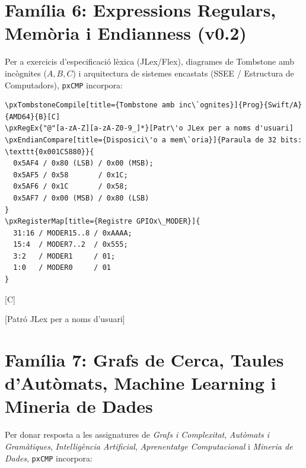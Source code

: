 \documentclass[11pt,a4paper]{article}
\begin{document}

\section{Fam\'ilia 6: Expressions Regulars, Mem\`oria i Endianness (v0.2)}

Per a exercicis d'especificaci\'o l\`exica (JLex/Flex), diagrames de Tombstone amb inc\`ognites ($A, B, C$) i arquitectura de sistemes encastats (SSEE / Estructura de Computadors), \texttt{pxCMP} incorpora:

\begin{verbatim}
\pxTombstoneCompile[title={Tombstone amb inc\`ognites}]{Prog}{Swift/A}{AMD64}{B}[C]
\pxRegEx{"@"[a-zA-Z][a-zA-Z0-9_]*}[Patr\'o JLex per a noms d'usuari]
\pxEndianCompare[title={Disposici\'o a mem\`oria}]{Paraula de 32 bits: \texttt{0x001C5880}}{
  0x5AF4 / 0x80 (LSB) / 0x00 (MSB);
  0x5AF5 / 0x58       / 0x1C;
  0x5AF6 / 0x1C       / 0x58;
  0x5AF7 / 0x00 (MSB) / 0x80 (LSB)
}
\pxRegisterMap[title={Registre GPIOx\_MODER}]{
  31:16 / MODER15..8 / 0xAAAA;
  15:4  / MODER7..2  / 0x555;
  3:2   / MODER1     / 01;
  1:0   / MODER0     / 01
}
\end{verbatim}

[C]

[Patr\'o JLex per a noms d'usuari]



\newpage
\section{Fam\'ilia 7: Grafs de Cerca, Taules d'Aut\`omats, Machine Learning i Mineria de Dades}

Per donar resposta a les assignatures de \emph{Grafs i Complexitat}, \emph{Aut\`omats i Gram\`atiques}, \emph{Intel\textperiodcentered lig\`encia Artificial}, \emph{Aprenentatge Computacional} i \emph{Mineria de Dades}, \texttt{pxCMP} incorpora:
\end{document}
